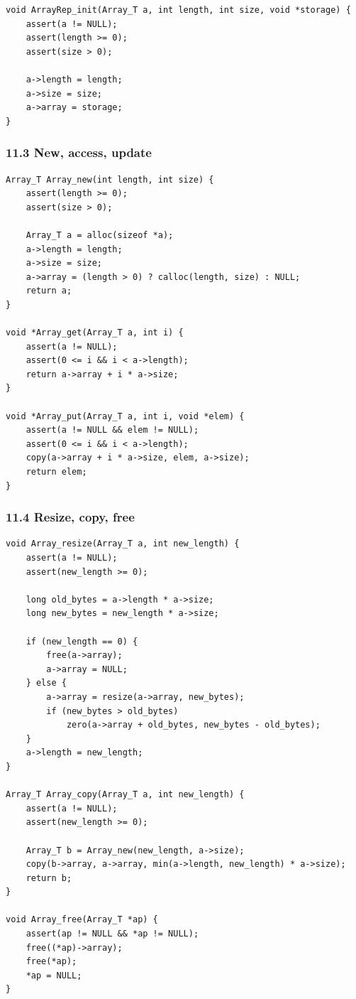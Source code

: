\documentclass[11pt]{article}
\begin{document}
\begin{verbatim}
void ArrayRep_init(Array_T a, int length, int size, void *storage) {
    assert(a != NULL);
    assert(length >= 0);
    assert(size > 0);

    a->length = length;
    a->size = size;
    a->array = storage;
}
\end{verbatim}

\subsubsection{11.3 New, access, update}\label{new-access-update}

\begin{verbatim}
Array_T Array_new(int length, int size) {
    assert(length >= 0);
    assert(size > 0);

    Array_T a = alloc(sizeof *a);
    a->length = length;
    a->size = size;
    a->array = (length > 0) ? calloc(length, size) : NULL;
    return a;
}

void *Array_get(Array_T a, int i) {
    assert(a != NULL);
    assert(0 <= i && i < a->length);
    return a->array + i * a->size;
}

void *Array_put(Array_T a, int i, void *elem) {
    assert(a != NULL && elem != NULL);
    assert(0 <= i && i < a->length);
    copy(a->array + i * a->size, elem, a->size);
    return elem;
}
\end{verbatim}

\subsubsection{11.4 Resize, copy, free}\label{resize-copy-free}

\begin{verbatim}
void Array_resize(Array_T a, int new_length) {
    assert(a != NULL);
    assert(new_length >= 0);

    long old_bytes = a->length * a->size;
    long new_bytes = new_length * a->size;

    if (new_length == 0) {
        free(a->array);
        a->array = NULL;
    } else {
        a->array = resize(a->array, new_bytes);
        if (new_bytes > old_bytes)
            zero(a->array + old_bytes, new_bytes - old_bytes);
    }
    a->length = new_length;
}

Array_T Array_copy(Array_T a, int new_length) {
    assert(a != NULL);
    assert(new_length >= 0);

    Array_T b = Array_new(new_length, a->size);
    copy(b->array, a->array, min(a->length, new_length) * a->size);
    return b;
}

void Array_free(Array_T *ap) {
    assert(ap != NULL && *ap != NULL);
    free((*ap)->array);
    free(*ap);
    *ap = NULL;
}
\end{verbatim}
\end{document}
